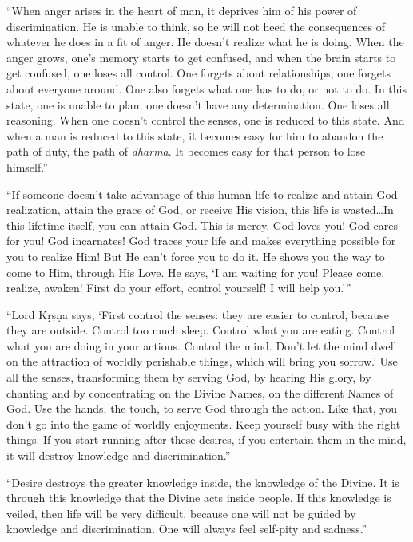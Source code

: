 \enquote{When anger arises in the heart of man, it deprives him of his power of discrimination. He is unable to think, so he will not heed the consequences of whatever he does in a fit of anger. He doesn’t realize what he is doing. When the anger grows, one’s memory starts to get confused, and when the brain starts to get confused, one loses all control. One forgets about relationships; one forgets about everyone around. One also forgets what one has to do, or not to do. In this state, one is unable to plan; one doesn’t have any determination. One loses all reasoning. When one doesn’t control the senses, one is reduced to this state. And when a man is reduced to this state, it becomes easy for him to abandon the path of duty, the path of \textit{dharma}. It becomes easy for that person to lose himself.}

\enquote{If someone doesn’t take advantage of this human life to realize and attain God-realization, attain the grace of God, or receive His vision, this life is wasted\ldots In this lifetime itself, you can attain God. This is mercy. God loves you! God cares for you! God incarnates! God traces your life and makes everything possible for you to realize Him! But He can’t force you to do it. He shows you the way to come to Him, through His Love. He says, \enquote{I am waiting for you! Please come, realize, awaken! First do your effort, control yourself! I will help you.}}

\enquote{Lord Kṛṣṇa says, \enquote{First control the senses: they are easier to control, because they are outside. Control too much sleep. Control what you are eating. Control what you are doing in your actions. Control the mind. Don’t let the mind dwell on the attraction of worldly perishable things, which will bring you sorrow.} Use all the senses, transforming them by serving God, by hearing His glory, by chanting and by concentrating on the Divine Names, on the different Names of God. Use the hands, the touch, to serve God through the action. Like that, you don’t go into the game of worldly enjoyments. Keep yourself busy with the right things. If you start running after these desires, if you entertain them in the mind, it will destroy knowledge and discrimination.}

\enquote{Desire destroys the greater knowledge inside, the knowledge of the Divine. It is through this knowledge that the Divine acts inside people. If this knowledge is veiled, then life will be very difficult, because one will not be guided by knowledge and discrimination. One will always feel self-pity and sadness.}

